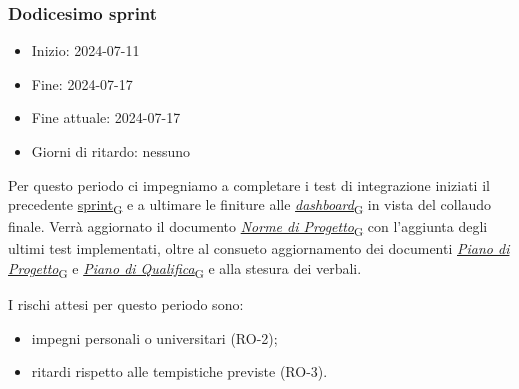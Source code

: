 \newpage
\subsubsection{Dodicesimo sprint}
\begin{itemize}
    \item Inizio: 2024-07-11
    \item Fine: 2024-07-17
    \item Fine attuale: 2024-07-17
    \item Giorni di ritardo: nessuno
\end{itemize}

Per questo periodo ci impegniamo a completare i test di integrazione iniziati il precedente \href{https://7last.github.io/docs/pb/documentazione-interna/glossario\#sprint}{sprint\textsubscript{G}} e a ultimare le finiture alle \href{https://7last.github.io/docs/pb/documentazione-interna/glossario\#dashboard}{\textit{dashboard}\textsubscript{G}} in vista del collaudo finale. Verrà aggiornato il documento \href{https://7last.github.io/docs/pb/documentazione-interna/glossario\#norme-di-progetto}{\textit{Norme di Progetto}\textsubscript{G}} con l'aggiunta degli ultimi test implementati, oltre al consueto aggiornamento dei documenti \href{https://7last.github.io/docs/pb/documentazione-interna/glossario\#piano-di-progetto}{\textit{Piano di Progetto}\textsubscript{G}} e \href{https://7last.github.io/docs/pb/documentazione-interna/glossario\#piano-di-qualifica}{\textit{Piano di Qualifica}\textsubscript{G}} e alla stesura dei verbali.

I rischi attesi per questo periodo sono:
\begin{itemize}
    \item impegni personali o universitari (RO-2);
	\item ritardi rispetto alle tempistiche previste (RO-3).
\end{itemize}

